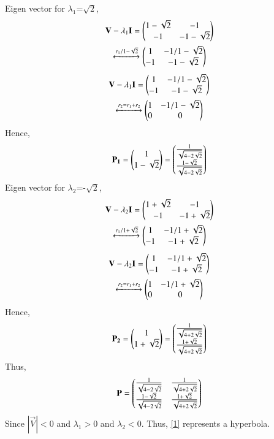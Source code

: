 \documentclass[journal,12pt,twocolumn]{IEEEtran}
\begin{document}
Eigen vector for $\lambda_1$=$\sqrt{2}$,
\begin{multline}
	\mathbf{V}-\lambda_1\mathbf{I} = \begin{pmatrix}1-\sqrt{2} & -1 \\ -1 & -1-\sqrt{2}\end{pmatrix}\\
	 \xleftrightarrow[]{r_1/1-\sqrt{2}} \begin{pmatrix}1 & -1/1-\sqrt{2} \\ -1 & -1-\sqrt{2}\end{pmatrix}
\end{multline}
\begin{multline}
	\mathbf{V}-\lambda_1\mathbf{I} = \begin{pmatrix}1 & -1/1-\sqrt{2} \\ -1 & -1-\sqrt{2}\end{pmatrix} \\
	\xleftrightarrow[]{r_2 = r_1 + r_2} \begin{pmatrix}1 & -1/1-\sqrt{2} \\ 0 & 0\end{pmatrix}
\end{multline}
Hence,
\begin{align}
\mathbf{P_1}= \begin{pmatrix}1 \\ 1-\sqrt{2}\end{pmatrix} = \begin{pmatrix}\frac{1}{\sqrt{4-2\sqrt{2}}} \\ \frac{1-\sqrt{2}}{\sqrt{4-2\sqrt{2}}}\end{pmatrix}
\end{align}
Eigen vector for $\lambda_2$=-$\sqrt{2}$,
\begin{multline}
	\mathbf{V}-\lambda_2\mathbf{I} = \begin{pmatrix}1+\sqrt{2} & -1 \\ -1 & -1+\sqrt{2}\end{pmatrix}\\
	\xleftrightarrow[]{r_1/1+\sqrt{2}} \begin{pmatrix}1 & -1/1+\sqrt{2} \\ -1 & -1+\sqrt{2}\end{pmatrix}
\end{multline}
\begin{multline}
	\mathbf{V}-\lambda_2\mathbf{I} = \begin{pmatrix}1 & -1/1+\sqrt{2} \\ -1 & -1+\sqrt{2}\end{pmatrix} \\
	\xleftrightarrow[]{r_2 = r_1 + r_2} \begin{pmatrix}1 & -1/1+\sqrt{2} \\ 0 & 0\end{pmatrix}
\end{multline}
Hence,
\begin{align}
	\mathbf{P_2}= \begin{pmatrix}1\\1 + \sqrt{2} \end{pmatrix} = \begin{pmatrix}\frac{1}{\sqrt{4+2\sqrt{2}}} \\ \frac{1 + \sqrt{2}}{\sqrt{4+2\sqrt{2}}}\end{pmatrix}
\end{align}
Thus, 
\begin{align}
	\mathbf{P} = \begin{pmatrix}\frac{1}{\sqrt{4-2\sqrt{2}}} & \frac{1}{\sqrt{4+2\sqrt{2}}} \\ \frac{1-\sqrt{2}}{\sqrt{4-2\sqrt{2}}} & \frac{1 + \sqrt{2}}{\sqrt{4+2\sqrt{2}}} \end{pmatrix}
\end{align}
Since $|\vec{V}| <0$ and $\lambda_1 >0$ and $\lambda_2< 0$. Thus, \eqref{1} represents a hyperbola.\\
\end{document}
